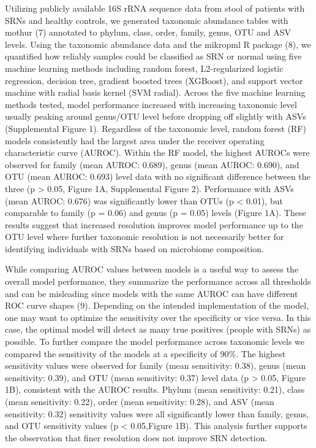\documentclass[
]{article}
\begin{document}
Utilizing publicly available 16S rRNA sequence data from stool of
patients with SRNs and healthy controls, we generated taxonomic
abundance tables with mothur (7) annotated to phylum, class, order,
family, genus, OTU and ASV levels. Using the taxonomic abundance data
and the mikropml R package (8), we quantified how reliably samples could
be classified as SRN or normal using five machine learning methods
including random forest, L2-regularized logistic regression, decision
tree, gradient boosted trees (XGBoost), and support vector machine with
radial basis kernel (SVM radial). Across the five machine learning
methods tested, model performance increased with increasing taxonomic
level usually peaking around genus/OTU level before dropping off
slightly with ASVs (Supplemental Figure 1). Regardless of the taxonomic
level, random forest (RF) models consistently had the largest area under
the receiver operating characteristic curve (AUROC). Within the RF
model, the highest AUROCs were observed for family (mean AUROC: 0.689),
genus (mean AUROC: 0.690), and OTU (mean AUROC: 0.693) level data with
no significant difference between the three (p \textgreater{} 0.05,
Figure 1A, Supplemental Figure 2). Performance with ASVs (mean AUROC:
0.676) was significantly lower than OTUs (p \textless{} 0.01), but
comparable to family (p = 0.06) and genus (p = 0.05) levels (Figure 1A).
These results suggest that increased resolution improves model
performance up to the OTU level where further taxonomic resolution is
not necessarily better for identifying individuals with SRNs based on
microbiome composition.

While comparing AUROC values between models is a useful way to assess
the overall model performance, they summarize the performance across all
thresholds and can be misleading since models with the same AUROC can
have different ROC curve shapes (9). Depending on the intended
implementation of the model, one may want to optimize the sensitivity
over the specificity or vice versa. In this case, the optimal model will
detect as many true positives (people with SRNs) as possible. To further
compare the model performance across taxonomic levels we compared the
sensitivity of the models at a specificity of 90\%. The highest
sensitivity values were observed for family (mean sensitivity: 0.38),
genus (mean sensitivity: 0.39), and OTU (mean sensitivity: 0.37) level
data (p \textgreater{} 0.05, Figure 1B), consistent with the AUROC
results. Phylum (mean sensitivity: 0.21), class (mean sensitivity:
0.22), order (mean sensitivity: 0.28), and ASV (mean sensitivity: 0.32)
sensitivity values were all significantly lower than family, genus, and
OTU sensitivity values (p \textless{} 0.05,Figure 1B). This analysis
further supports the observation that finer resolution does not improve
SRN detection.
\end{document}
